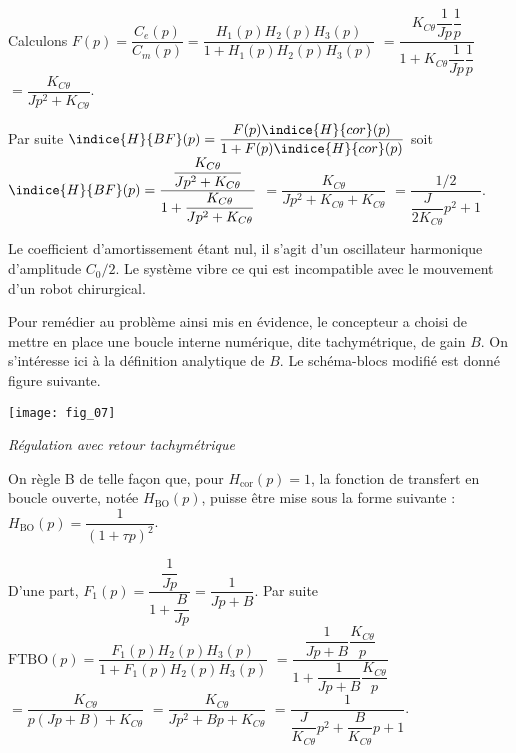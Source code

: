 \begin{multicols}{2}

\ifprof
\begin{corrige}
Calculons $F(p) =\dfrac{C_e(p)}{C_m(p)} = \dfrac{H_1(p)H_2(p)H_3(p)}{1+H_1(p)H_2(p)H_3(p)}$
$= \dfrac{K_{C\theta}\dfrac{1}{Jp}\dfrac{1}{p}}{1+K_{C\theta}\dfrac{1}{Jp}\dfrac{1}{p}}$
$= \dfrac{K_{C\theta}}{Jp^2+K_{C\theta}}$.

Par suite $\indice{H}{BF}(p)=\dfrac{F(p) \indice{H}{cor}(p)}{1+F(p) \indice{H}{cor}(p)}$ soit
 $\indice{H}{BF}(p)= \dfrac{\dfrac{K_{C\theta}}{Jp^2+K_{C\theta}} }{1+\dfrac{K_{C\theta}}{Jp^2+K_{C\theta}} }$
$= \dfrac{K_{C\theta}}{Jp^2+K_{C\theta}+K_{C\theta} }$
$= \dfrac{1/2}{\dfrac{J}{2K_{C\theta}}p^2+1 }$.
\end{corrige}
\else
\fi

\ifprof
\begin{corrige}
Le coefficient d'amortissement étant nul, il s'agit d'un oscillateur harmonique d'amplitude $C_0/2$. Le système vibre ce qui est incompatible avec le mouvement d'un robot chirurgical.
\end{corrige}
\else
\fi

\vspace{.25cm}

Pour remédier au problème ainsi mis en évidence, le concepteur a choisi de mettre en place une boucle
interne numérique, dite tachymétrique, de gain $B$. On s’intéresse ici à la définition analytique de $B$.
Le schéma-blocs modifié est donné figure suivante.


\begin{center}
\texttt{[image: fig\_07]}

\textit{Régulation avec retour tachymétrique}
\end{center}


On règle B de telle façon que, pour $H_{\text{cor}}(p)=1$, la fonction de transfert en boucle ouverte, notée $H_{\text{BO}}(p)$, puisse être mise sous la forme suivante : 
$H_{\text{BO}}(p)=\dfrac{1}{\left(1+\tau p\right)^2}$.



\ifprof
\begin{corrige}
D'une part, $F_1(p)=\dfrac{\dfrac{1}{Jp}}{1+\dfrac{B}{Jp}} = \dfrac{1}{Jp+B}$.
Par suite $\text{FTBO}(p) = \dfrac{F_1(p) H_2(p) H_3(p)}{1+F_1(p) H_2(p) H_3(p)}$
$= \dfrac{\dfrac{1}{Jp+B} \dfrac{K_{C\theta}}{p}}{1+\dfrac{1}{Jp+B} \dfrac{K_{C\theta}}{p}}$
$= \dfrac{K_{C\theta}}{p\left(Jp+B\right)+K_{C\theta}}$
$= \dfrac{K_{C\theta}}{Jp^2+Bp+K_{C\theta}}$
$= \dfrac{1}{\dfrac{J}{K_{C\theta}}p^2+\dfrac{B}{K_{C\theta}}p+1}$.


\end{corrige}
\end{multicols}
